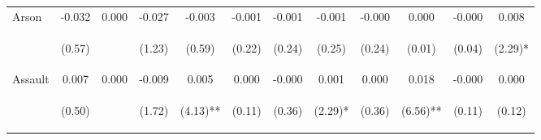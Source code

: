\begin{tabular}{lccccccccccc}
\noalign{\smallskip}Arson & -0.032 & 0.000 & -0.027 & -0.003 & -0.001 & -0.001 & -0.001 & -0.000 & 0.000 & -0.000 & 0.008\\
 & \begin{footnotesize}(0.57)\end{footnotesize} & \begin{footnotesize}\end{footnotesize} & \begin{footnotesize}(1.23)\end{footnotesize} & \begin{footnotesize}(0.59)\end{footnotesize} & \begin{footnotesize}(0.22)\end{footnotesize} & \begin{footnotesize}(0.24)\end{footnotesize} & \begin{footnotesize}(0.25)\end{footnotesize} & \begin{footnotesize}(0.24)\end{footnotesize} & \begin{footnotesize}(0.01)\end{footnotesize} & \begin{footnotesize}(0.04)\end{footnotesize} & \begin{footnotesize}(2.29)*\end{footnotesize}\\
\noalign{\smallskip}Assault & 0.007 & 0.000 & -0.009 & 0.005 & 0.000 & -0.000 & 0.001 & 0.000 & 0.018 & -0.000 & 0.000\\
 & \begin{footnotesize}(0.50)\end{footnotesize} & \begin{footnotesize}\end{footnotesize} & \begin{footnotesize}(1.72)\end{footnotesize} & \begin{footnotesize}(4.13)**\end{footnotesize} & \begin{footnotesize}(0.11)\end{footnotesize} & \begin{footnotesize}(0.36)\end{footnotesize} & \begin{footnotesize}(2.29)*\end{footnotesize} & \begin{footnotesize}(0.36)\end{footnotesize} & \begin{footnotesize}(6.56)**\end{footnotesize} & \begin{footnotesize}(0.11)\end{footnotesize} & \begin{footnotesize}(0.12)\end{footnotesize}\\

\end{tabular}
